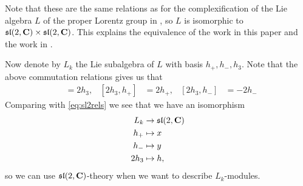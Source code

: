 \begin{remark}
  Note that these are the same relations as for the complexification of the Lie algebra $L$ of the proper Lorentz group in \cite[5]{indecompReprOfLorGr}, so $L$ is isomorphic to $\mathfrak{sl}(2,\mathbf{C})\times \mathfrak{sl}(2,\mathbf{C})$. This explains the equivalence of the work in this paper and the work in \cite{classifOfIndec,catOfHarChaMod,indecompReprOfLorGr}.
\end{remark}

Now denote by $L_k$ the Lie subalgebra of $L$ with basis $h_+,h_-,h_3$. Note that the above commutation relations gives us that 
\begin{align*}
  [h_+,h_-] &= 2h_3, & [2h_3,h_+] &= 2h_+, & [2h_3,h_-] &= -2h_-
\end{align*}
Comparing with \cref{eq:sl2rels} we see that we have an isomorphism
\begin{align}
  \begin{split}
    L_k &\to \mathfrak{sl}(2,\mathbf{C}) \\ \label{eq:sl2iso}
    h_+ &\mapsto x  \\
    h_- &\mapsto y \\
    2h_3 &\mapsto h,
  \end{split}
\end{align}
so we can use $\mathfrak{sl}(2,\mathbf{C})$-theory when we want to describe $L_k$-modules.

